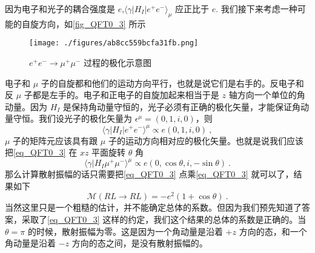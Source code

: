 因为电子和光子的耦合强度是 $e$,$\langle \gamma | H_I | e^+ e^- \rangle_\mu$ 应正比于 $e$. 我们接下来考虑一种可能的自旋方向，如\autoref{fig_QFT0_3} 所示
\begin{figure}[ht]
\centering
\texttt{[image: ./figures/ab8cc559bcfa31fb.png]}
\caption{$e^+e^-\rightarrow\mu^+\mu^-$ 过程的极化示意图} \label{fig_QFT0_3}
\end{figure}
电子和 $\mu$ 子的自旋都和他们的运动方向平行，也就是说它们是右手的。反电子和反 $\mu$ 子都是左手的。电子和正电子的自旋加起来相当于是 $z$ 轴方向一个单位的角动量。因为 $H_I$ 是保持角动量守恒的，光子必须有正确的极化矢量，才能保证角动量守恒。我们设光子的极化矢量为 $\epsilon^\mu =(0,1,i,0)$，则
\begin{equation}
\langle \gamma | H_I | e^+ e^- \rangle^\mu \propto e (0,1,i ,0)~,
\end{equation}
$\mu$ 子的矩阵元应该具有跟 $\mu$ 子的运动方向相对应的极化矢量。也就是说我们应该把\autoref{eq_QFT0_3} 在 $xz$ 平面旋转 $\theta$ 角
\begin{equation}
\langle \gamma| H_I \mu^+\mu^-\rangle^\mu \propto e (0,\cos\theta, i, - \sin\theta) ~.
\end{equation}
那么计算散射振幅的话只需要把\autoref{eq_QFT0_3} 点乘\autoref{eq_QFT0_3} 就可以了，结果如下
\begin{equation}
\mathcal M(RL\rightarrow RL) = - e^2 (1+\cos\theta)~.
\end{equation}
当然这里只是一个粗糙的估计，并不能确定总体的系数。但因为我们预先知道了答案，采取了\autoref{eq_QFT0_3} 这样的约定，我们这个结果的总体的系数是正确的。当 $\theta = \pi$ 的时候，散射振幅为零。这是因为一个角动量是沿着 $+z$ 方向的态，和一个角动量是沿着 $-z$ 方向的态之间，是没有散射振幅的。

